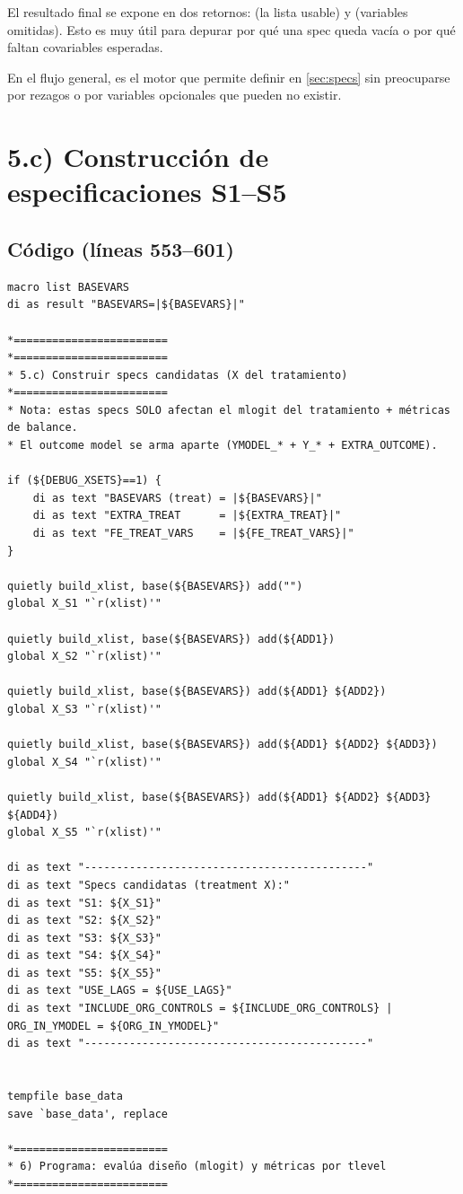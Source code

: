 \documentclass[12pt]{article}
\newcommand{\ttt}[1]{\texttt{\detokenize{#1}}}
\begin{document}
El resultado final se expone en dos retornos: \ttt{r(xlist)} (la lista usable) y \ttt{r(skipped)} (variables omitidas). Esto es muy útil para depurar por qué una spec queda vacía o por qué faltan covariables esperadas.

En el flujo general, \ttt{build_xlist} es el motor que permite definir \ttt{S1--S5} en \autoref{sec:specs} sin preocuparse por rezagos o por variables opcionales que pueden no existir.


\section{5.c) Construcción de especificaciones S1--S5}\label{sec:specs}
\subsection*{Código (líneas 553--601)}
\begin{lstlisting}
macro list BASEVARS
di as result "BASEVARS=|${BASEVARS}|"

*========================
*========================
* 5.c) Construir specs candidatas (X del tratamiento)
*========================
* Nota: estas specs SOLO afectan el mlogit del tratamiento + métricas de balance.
* El outcome model se arma aparte (YMODEL_* + Y_* + EXTRA_OUTCOME).

if (${DEBUG_XSETS}==1) {
    di as text "BASEVARS (treat) = |${BASEVARS}|"
    di as text "EXTRA_TREAT      = |${EXTRA_TREAT}|"
    di as text "FE_TREAT_VARS    = |${FE_TREAT_VARS}|"
}

quietly build_xlist, base(${BASEVARS}) add("")
global X_S1 "`r(xlist)'"

quietly build_xlist, base(${BASEVARS}) add(${ADD1})
global X_S2 "`r(xlist)'"

quietly build_xlist, base(${BASEVARS}) add(${ADD1} ${ADD2})
global X_S3 "`r(xlist)'"

quietly build_xlist, base(${BASEVARS}) add(${ADD1} ${ADD2} ${ADD3})
global X_S4 "`r(xlist)'"

quietly build_xlist, base(${BASEVARS}) add(${ADD1} ${ADD2} ${ADD3} ${ADD4})
global X_S5 "`r(xlist)'"

di as text "--------------------------------------------"
di as text "Specs candidatas (treatment X):"
di as text "S1: ${X_S1}"
di as text "S2: ${X_S2}"
di as text "S3: ${X_S3}"
di as text "S4: ${X_S4}"
di as text "S5: ${X_S5}"
di as text "USE_LAGS = ${USE_LAGS}"
di as text "INCLUDE_ORG_CONTROLS = ${INCLUDE_ORG_CONTROLS} | ORG_IN_YMODEL = ${ORG_IN_YMODEL}"
di as text "--------------------------------------------"


tempfile base_data
save `base_data', replace

*========================
* 6) Programa: evalúa diseño (mlogit) y métricas por tlevel
*========================
\end{lstlisting}
\end{document}
